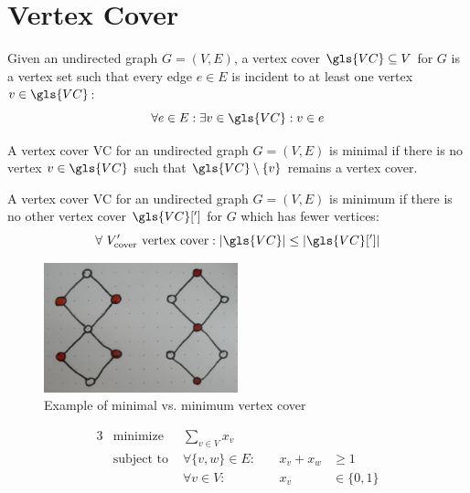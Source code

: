 \section{Vertex Cover}

\begin{definition}
  \label{def:vertex_cover}
  Given an undirected graph \(G=(V,E)\), a vertex cover
  \(\gls{VC} \subseteq V\) for \(G\) is a vertex set such that
  every edge \(e \in E\) is incident to at least one vertex
  \(v \in \gls{VC}\):
  \[ \forall e \in E: \exists v \in \gls{VC}: v \in e \]
\end{definition}


\begin{definition}
  A vertex cover \gls{VC} for an undirected graph
  \(G=(V,E)\) is minimal if there is no vertex
  \(v \in \gls{VC}\) such that
  \(\gls{VC} \setminus \{v\}\) remains a vertex cover.
\end{definition}


\begin{definition}
  A vertex cover \gls{VC} for an undirected graph
  \(G=(V,E)\) is minimum if there is no other vertex cover
  \(\gls{VC}[']\) for \(G\) which has fewer vertices:
  \[
    \forall~V_{\text{cover}}'\text{ vertex cover} :
    |\gls{VC}| \leq |\gls{VC}[']|
  \]
\end{definition}

\begin{figure}[ht]
  \centering
  \includegraphics[width=0.5\textwidth]{img/example_vertex_cover.jpg}
  \caption{\label{fig:example_vertex_cover}Example of minimal vs. minimum vertex cover}
\end{figure}


\begin{problem}
  \begin{alignat*}{3}
    &\text{minimize } & \sum\limits_{v \in V} x_v \\
    &\text{subject to } & \forall \{v,w\} \in E : &~& x_v + x_w &\geq 1 \\
    && \forall v \in V : &~& x_v &\in \{0,1\}
  \end{alignat*}
\end{problem}

